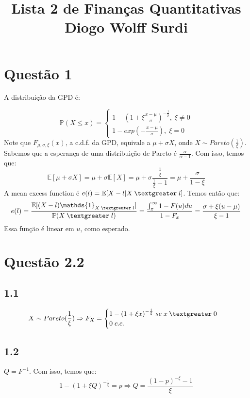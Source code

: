\documentclass[12pt]{article}
\title{Lista 2 de Finanças Quantitativas\\
Diogo Wolff Surdi}
\begin{document}
\maketitle

\section*{Questão 1}

A distribuição da GPD é:

\begin{equation*}
\mathbb{P}(X \leq x)= \begin{cases}
1-(1+\xi\frac{x-\mu}{\sigma})^{-\frac{1}{\xi}}, \; \xi \neq 0\\
1-exp(-\frac{x-\mu}{\sigma}), \; \xi =0
\end{cases}
\end{equation*}
Note que $F_{\mu,\sigma,\xi}(x)$, a c.d.f. da GPD, equivale a $\mu+\sigma X$, onde $X\sim Pareto(\frac{1}{\xi})$. Sabemos que a esperança de uma distribuição de Pareto é $\frac{\alpha}{\alpha-1}$. Com isso, temos que:
\begin{equation*}
\mathbb{E}[\mu+\sigma X]=\mu +\sigma \mathbb{E}[X]=\mu + \sigma \frac{\frac{1}{\xi}}{\frac{1}{\xi}-1}=\mu+\frac{\sigma}{1-\xi}
\end{equation*}
A mean excess function é $e(l)=\mathbb{E}[X-l|X\:\textgreater \;l]$. Temos então que:
\begin{equation*}
e(l)=\frac{\mathbb{E}[(X-l)\mathds{1}_{X\:\textgreater \;l}]}{\mathbb{P}(X\:\textgreater \;l)}=
\frac{\int_{x}^{\infty}{1-F(u)}du}{1-F_{x}}=\frac{\sigma+\xi(u-\mu)}{\xi-1}
\end{equation*}
Essa função é linear em $u$, como esperado.

\section*{Questão 2.2}

\subsection*{1.1}
\begin{equation*}
X \sim Pareto(\frac{1}{\xi}) \Rightarrow F_{X}=
\begin{cases}
	1-(1+\xi x)^{-\frac{1}{\xi}}\; se\; x\:\textgreater \;0\\
	0 \; c.c.
\end{cases}
\end{equation*}
\subsection*{1.2}
$Q=F^{-1}$. Com isso, temos que:
\begin{equation*}
1-(1+\xi Q)^{-\frac{1}{\xi}}=p \Longrightarrow Q=\frac{(1-p)^{-\xi}-1}{\xi}
\end{equation*}
\end{document}
